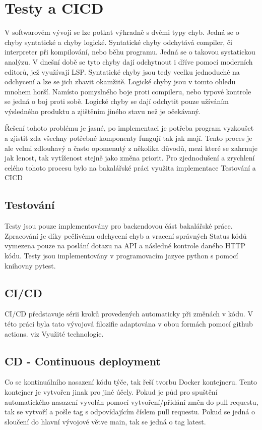 \chapter{Testy a CICD}
V softwarovém vývoji se lze potkat výhradně s dvěmi typy chyb. Jedná se o chyby syntatické a chyby logické. Syntatické chyby odchytává compiler, či interpreter při kompilování, nebo běhu programu. Jedná se o takovou systatickou analýzu. V dnešní době se tyto chyby dají odchytnout i dříve pomocí moderních editorů, jež využívají LSP. Syntatické chyby jsou tedy vcelku jednoduché na odchycení a lze se jich zbavit okamžitě. Logické chyby jsou v tomto ohledu mnohem horší. Namísto pomyslného boje proti compileru, nebo typové kontrole se jedná o boj proti sobě. Logické chyby se dají odchytit pouze užíváním výsledného produktu a zjištěním jiného stavu než je očekávaný. 

Řešení tohoto problému je jasné, po implementaci je potřeba program vyzkoušet a zjistit zda všechny potřebné komponenty fungují tak jak mají. Tento proces je ale velmi zdlouhavý a často opomenutý z několika důvodů, mezi které se zahrnuje jak lenost, tak vytíženost stejně jako změna priorit. Pro zjednodušení a zrychlení celého tohoto procesu bylo na bakalářské práci využita implementace Testování a CICD

\section{Testování}
Testy jsou pouze implementovány pro backendovou část bakalářské práce. Zpracování je díky pečlivému odchycení chyb a vracení správných Status kódů vymezena pouze na poslání dotazu na API a následné kontrole daného HTTP kódu. Testy jsou implementovány v programovacím jazyce python s pomocí knihovny pytest.

\section{CI/CD}
CI/CD představuje sérii kroků provedených automaticky při změnách v kódu. V této práci byla tato vývojová filozifie adaptována v obou formách pomocí github actions. viz Využité technologie.

\section{CD - Continuous deployment}
Co se kontinuálního nasazení kódu týče, tak řeší tvorbu Docker kontejneru. Tento kontejner je vytvořen jinak pro jiné účely. Pokud je půd pro spuštění automatického nasazení vyvolán pomocí vytvoření/přidání změn do pull requestu, tak se vytvoří a pošle tag s odpovídajícím číslem pull requestu. Pokud se jedná o sloučení do hlavní vývojové větve main, tak se jedná o tag latest.


